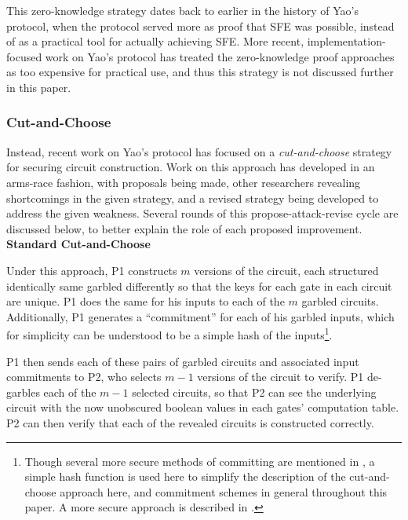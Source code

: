 This zero-knowledge strategy dates back to earlier in the history of Yao's protocol, when the protocol served more as proof that \ac{SFE} was possible, instead of as a practical tool for actually achieving \ac{SFE}. More recent, implementation-focused work on Yao's protocol has treated the zero-knowledge proof approaches as too expensive for practical use\cite{lindell2007efficient, mohassel2006efficiency, malkhi2004fairplay}, and thus this strategy is not discussed further in this paper.

\subsubsection{Cut-and-Choose}
\label{sec:cutchoosesimple}

Instead, recent work on Yao's protocol has focused on a \emph{cut-and-choose} strategy for securing circuit construction\cite{malkhi2004fairplay}. Work on this approach has developed in an arms-race fashion, with proposals being made, other researchers revealing shortcomings in the given strategy, and a revised strategy being developed to address the given weakness. Several rounds of this propose-attack-revise cycle are discussed below, to better explain the role of each proposed improvement.\\[.5em]

\noindent\textbf{Standard Cut-and-Choose}

Under this approach, \ac{P1} constructs $m$ versions of the circuit, each structured identically same garbled differently so that the keys for each gate in each circuit are unique. \ac{P1} does the same for his inputs to each of the $m$ garbled circuits. Additionally, \ac{P1} generates a ``commitment'' for each of his garbled inputs, which for simplicity can be understood to be a simple hash of the inputs\footnote{Though several more secure methods of committing are mentioned in \cite{lindell2007efficient}, a simple hash function is used here to simplify the description of the cut-and-choose approach here, and commitment schemes in general throughout this paper.  A more secure approach is described in \cite{halevi1996practical}.}.

\ac{P1} then sends each of these pairs of garbled circuits and associated input commitments to \ac{P2}, who selects $m-1$ versions of the circuit to verify.  \ac{P1} de-garbles each of the $m-1$ selected circuits, so that \ac{P2} can see the underlying circuit with the now unobscured boolean values in each gates' computation table.  \ac{P2} can then verify that each of the revealed circuits is constructed correctly.

